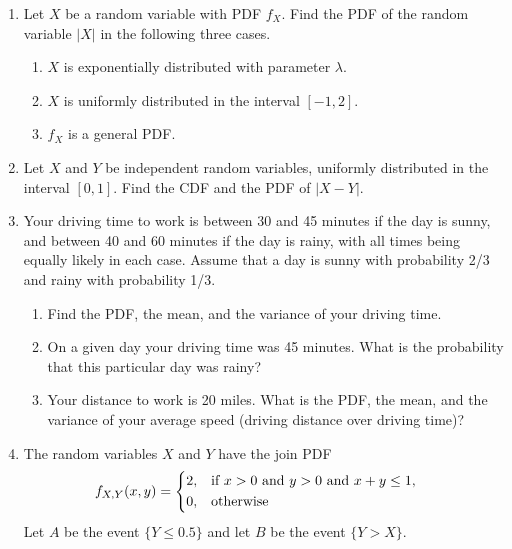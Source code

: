 \documentclass[paper=usletter, fontsize=12pt]{article}
\begin{document}

    \begin{enumerate}

        \item Let $X$ be a random variable with PDF $f_X$. Find the PDF of the
        random variable $|X|$ in the following three cases.
        \begin{enumerate}

            \item $X$ is exponentially distributed with parameter $\lambda$.

            \item $X$ is uniformly distributed in the interval $[-1,2]$.

            \item $f_X$ is a general PDF.

        \end{enumerate}

        \item Let $X$ and $Y$ be independent random variables, uniformly
        distributed in the interval $[0,1]$. Find the CDF and the PDF of
        $|X-Y|$.

        \item Your driving time to work is between 30 and 45 minutes if the day
        is sunny, and between 40 and 60 minutes if the day is rainy, with all
        times being equally likely in each case. Assume that a day is sunny
        with probability 2/3 and rainy with probability 1/3.

        \begin{enumerate}

            \item Find the PDF, the mean, and the variance of your driving
            time.

            \item On a given day your driving time was 45 minutes. What is the
            probability that this particular day was rainy?

            \item Your distance to work is 20 miles. What is the PDF, the mean,
            and the variance of your average speed (driving distance over
            driving time)?

        \end{enumerate}

        \item The random variables $X$ and $Y$ have the join PDF
        \begin{align*}
            f_{X,Y}(x,y) & =
            \begin{dcases}
                2, & \text{if $x > 0$ and $y>0$ and $x+y\le 1$},\\
                0, & \text{otherwise}
            \end{dcases}
        \end{align*}
        Let $A$ be the event $\{Y \le 0.5\}$ and let $B$ be the event
        $\{Y>X\}$.
        \begin{enumerate}


\end{enumerate}
\end{enumerate}
\end{document}
